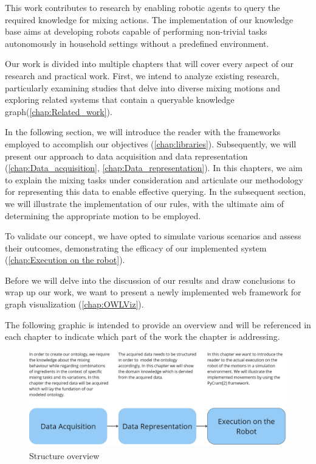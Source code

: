 This work contributes to research by enabling robotic agents to query the required knowledge for mixing actions. The implementation of our knowledge base aims at developing robots capable of performing non-trivial tasks autonomously in household settings without a predefined environment.


Our work is divided into multiple chapters that will cover every aspect of our research and practical work.
First, we intend to analyze existing research, particularly examining studies that delve into diverse mixing motions and exploring related systems that contain a queryable knowledge graph(\ref{chap:Related_work}).

In the following section, we will introduce the reader with the frameworks employed to accomplish our objectives (\ref{chap:libraries}).	
Subsequently, we will present our approach to data acquisition and data representation (\ref{chap:Data_acquisition}, \ref{chap:Data_representation}).
In this chapters, we aim to explain the mixing tasks under consideration and articulate our methodology for representing this data to enable effective querying.
In the subsequent section, we will illustrate the implementation of our rules, with the ultimate aim of determining the appropriate motion to be employed.

To validate our concept, we have opted to simulate various scenarios and assess their outcomes, demonstrating the efficacy of our implemented system (\ref{chap:Execution on the robot}).

Before we will delve into the discussion of our results and draw conclusions to wrap up our work, we want to present a newly implemented web framework for graph visualization (\ref{chap:OWLViz}).

The following graphic is intended to provide an overview and will be referenced in each chapter to indicate which part of the work the chapter is addressing.
\begin{figure}[H]
    \includegraphics[scale=0.25]{Graphics/structure_overview.jpg}
    \caption{Structure overview}
\end{figure}